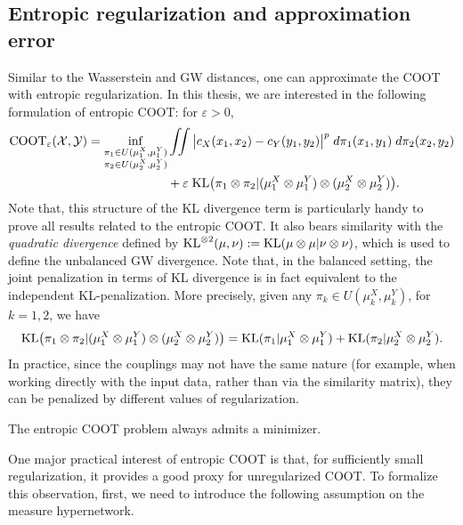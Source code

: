 \subsection{Entropic regularization and approximation error}
Similar to the Wasserstein and GW distances, one can approximate the COOT with entropic regularization.
In this thesis, we are interested in the following formulation of entropic COOT:
for $\varepsilon > 0$,
\begin{align}
  \text{COOT}_{\varepsilon} (\mathcal X, \mathcal Y) =
  \inf_{\substack{\pi_1 \in U(\mu^X_1, \mu^Y_1) \\
  \pi_2 \in U(\mu^X_2, \mu^Y_2)}} &\iint
  \big\vert c_X(x_1, x_2) - c_Y(y_1, y_2) \big\vert^p \; d\pi_1(x_1, y_1) \; d\pi_2(x_2, y_2) \\
  &+ \varepsilon \; \text{KL} \big( \pi_1 \otimes \pi_2 \vert (\mu^X_1 \otimes \mu^Y_1) \otimes (\mu^X_2 \otimes \mu^Y_2) \big).
\end{align}
Note that, this structure of the KL divergence term is particularly handy to prove all results related to
the entropic COOT. It also bears similarity with the \textit{quadratic divergence}
\citep{Sejourne20} defined by $\text{KL}^{\otimes 2}(\mu, \nu):= \text{KL}(\mu \otimes \mu | \nu \otimes \nu)$,
which is used to define the unbalanced GW divergence. Note that, in the balanced setting,
the joint penalization in terms of KL divergence is in fact equivalent to the
independent KL-penalization. More precisely, given any $\pi_k \in U(\mu_k^X, \mu_k^Y)$,
for $k=1,2$, we have
\begin{equation}
  \text{KL} \big( \pi_1 \otimes \pi_2 \vert (\mu^X_1 \otimes \mu^Y_1) \otimes (\mu^X_2 \otimes \mu^Y_2) \big)
  = \text{KL}(\pi_1 \vert \mu^X_1 \otimes \mu^Y_1) + \text{KL}(\pi_2 \vert \mu^X_2 \otimes \mu^Y_2).
\end{equation}
In practice, since the couplings may not have the same nature (for example,
when working directly with the input data, rather than via the similarity matrix),
they can be penalized by different values of regularization.
\begin{proposition}
The entropic COOT problem always admits a minimizer.
\end{proposition}
One major practical interest of entropic COOT is that, for sufficiently small regularization,
it provides a good proxy for unregularized COOT. To formalize this observation, first,
we need to introduce the following assumption on the measure hypernetwork.
